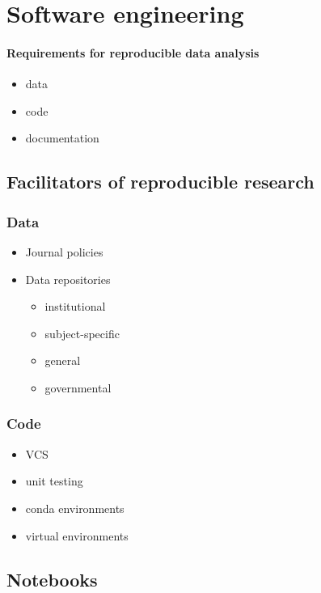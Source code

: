 \documentclass{article}
\begin{document}
\section{Software engineering}


\paragraph{Requirements for reproducible data analysis}

\begin{itemize}
	\item data
	\item code
	\item documentation
\end{itemize}

\subsection{Facilitators of reproducible research}

\subsubsection{Data}
\begin{itemize}
	\item Journal policies
	\item Data repositories \begin{itemize}
		      \item institutional
		      \item subject-specific
		      \item general
		      \item governmental
	      \end{itemize}
\end{itemize}


\subsubsection{Code}

\begin{itemize}
	\item VCS
	\item unit testing
	\item conda environments
	\item virtual environments
\end{itemize}

\subsection{Notebooks}
\end{document}
